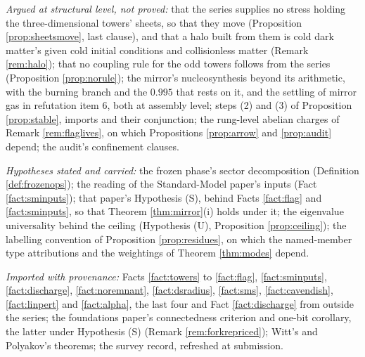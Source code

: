 \documentclass[11pt]{article}
\theoremstyle{definition}
\begin{document}
\emph{Argued at structural level, not proved:} that the series supplies no stress holding the three-dimensional towers' sheets, so that they move (Proposition \ref{prop:sheetsmove}, last clause), and that a halo built from them is cold dark matter's given cold initial conditions and collisionless matter (Remark \ref{rem:halo}); that no coupling rule for the odd towers follows from the series (Proposition \ref{prop:norule}); the mirror's nucleosynthesis beyond its arithmetic, with the burning branch and the $0.995$ that rests on it, and the settling of mirror gas in refutation item 6, both at assembly level; steps (2) and (3) of Proposition \ref{prop:stable}, imports and their conjunction; the rung-level abelian charges of Remark \ref{rem:flaglives}, on which Propositions \ref{prop:arrow} and \ref{prop:audit} depend; the audit's confinement clauses.

\emph{Hypotheses stated and carried:} the frozen phase's sector decomposition (Definition \ref{def:frozenops}); the reading of the Standard-Model paper's inputs (Fact \ref{fact:sminputs}); that paper's Hypothesis (S), behind Facts \ref{fact:flag} and \ref{fact:sminputs}, so that Theorem \ref{thm:mirror}(i) holds under it; the eigenvalue universality behind the ceiling (Hypothesis (U), Proposition \ref{prop:ceiling}); the labelling convention of Proposition \ref{prop:residues}, on which the named-member type attributions and the weightings of Theorem \ref{thm:modes} depend.

\emph{Imported with provenance:} Facts \ref{fact:towers} to \ref{fact:flag}, \ref{fact:sminputs}, \ref{fact:discharge}, \ref{fact:noremnant}, \ref{fact:dsradius}, \ref{fact:sms}, \ref{fact:cavendish}, \ref{fact:linpert} and \ref{fact:alpha}, the last four and Fact \ref{fact:discharge} from outside the series; the foundations paper's connectedness criterion and one-bit corollary, the latter under Hypothesis (S) (Remark \ref{rem:forkrepriced}); Witt's and Polyakov's theorems; the survey record, refreshed at submission.
\end{document}
